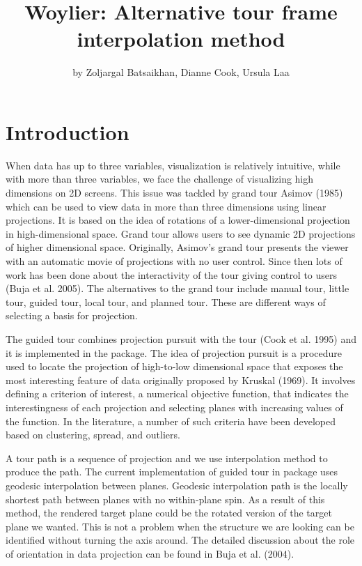 \title{Woylier: Alternative tour frame interpolation method}
\author{by Zoljargal Batsaikhan, Dianne Cook, Ursula Laa}

\maketitle


\hypertarget{introduction}{%
\section{Introduction}\label{introduction}}

When data has up to three variables, visualization is relatively intuitive, while with more than three variables, we face the challenge of visualizing high dimensions on 2D screens. This issue was tackled by grand tour Asimov (1985) which can be used to view data in more than three dimensions using linear projections. It is based on the idea of rotations of a lower-dimensional projection in high-dimensional space. Grand tour allows users to see dynamic 2D projections of higher dimensional space. Originally, Asimov's grand tour presents the viewer with an automatic movie of projections with no user control. Since then lots of work has been done about the interactivity of the tour giving control to users (Buja et al. 2005). The alternatives to the grand tour include manual tour, little tour, guided tour, local tour, and planned tour. These are different ways of selecting a basis for projection.

The guided tour combines projection pursuit with the tour (Cook et al. 1995) and it is implemented in the  package. The idea of projection pursuit is a procedure used to locate the projection of high-to-low dimensional space that exposes the most interesting feature of data originally proposed by Kruskal (1969). It involves defining a criterion of interest, a numerical objective function, that indicates the interestingness of each projection and selecting planes with increasing values of the function. In the literature, a number of such criteria have been developed based on clustering, spread, and outliers.

A tour path is a sequence of projection and we use interpolation method to produce the path. The current implementation of guided tour in  package uses geodesic interpolation between planes. Geodesic interpolation path is the locally shortest path between planes with no within-plane spin. As a result of this method, the rendered target plane could be the rotated version of the target plane we wanted. This is not a problem when the structure we are looking can be identified without turning the axis around. The detailed discussion about the role of orientation in data projection can be found in Buja et al. (2004).

